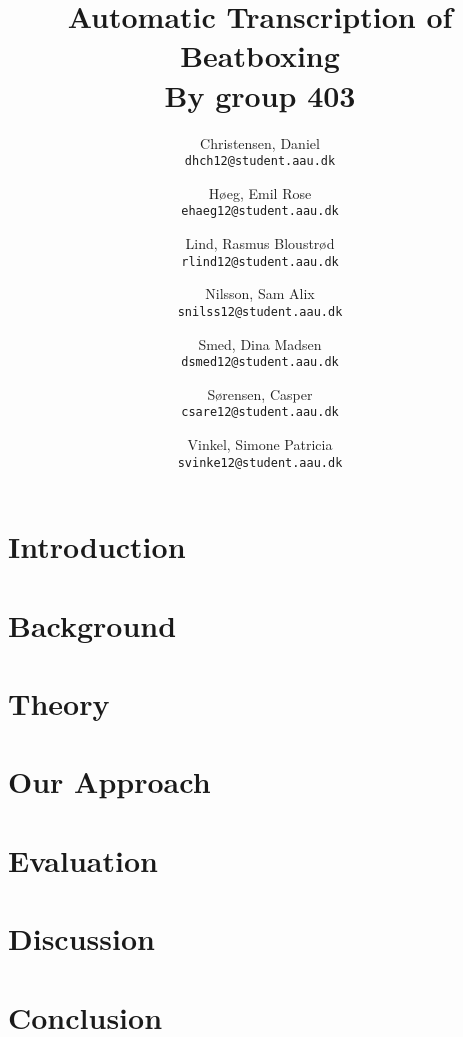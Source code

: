 \documentclass[12pt,a4paper]{report}
\author{
	Christensen, Daniel\\
	\texttt{dhch12@student.aau.dk}
	\and
	Høeg, Emil Rose \\
	\texttt{ehaeg12@student.aau.dk}
	\and
	Lind, Rasmus Bloustrød\\
	\texttt{rlind12@student.aau.dk}
	\and
	Nilsson, Sam Alix \\
	\texttt{snilss12@student.aau.dk}
	\and
	Smed, Dina Madsen\\
	\texttt{dsmed12@student.aau.dk}
	\and
	Sørensen, Casper\\
	\texttt{csare12@student.aau.dk}
	\and
	Vinkel, Simone Patricia \\
	\texttt{svinke12@student.aau.dk}
}
\title{{\LARGE \textbf{Automatic Transcription of Beatboxing}} \\
{{\Large By group 403}}}
\begin{document}
\maketitle
\tableofcontents
\chapter{Introduction}

\chapter{Background}


%


\chapter{Theory}







\chapter{Our Approach}



\chapter{Evaluation}
\chapter{Discussion}
\chapter{Conclusion}



\end{document}
